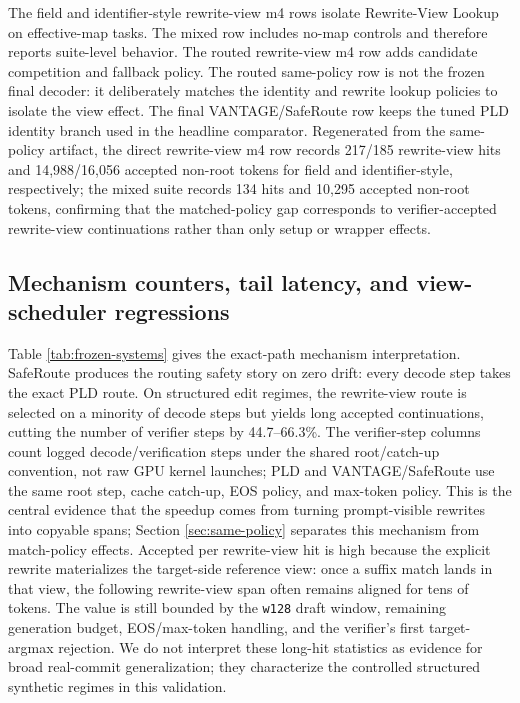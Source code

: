 \documentclass[11pt,a4paper]{article}
\begin{document}
The field and identifier-style rewrite-view m4 rows isolate Rewrite-View Lookup
on effective-map tasks. The mixed row includes no-map controls and therefore
reports suite-level behavior. The routed rewrite-view m4 row adds candidate
competition and fallback policy. The routed same-policy
row is not the frozen final decoder: it deliberately matches the identity and
rewrite lookup policies to isolate the view effect. The final VANTAGE/SafeRoute
row keeps the tuned PLD identity branch used in the headline comparator.
Regenerated from the same-policy artifact, the direct
rewrite-view m4 row records 217/185 rewrite-view hits and 14,988/16,056
accepted non-root tokens for field and identifier-style, respectively; the
mixed suite records 134 hits and 10,295 accepted non-root tokens,
confirming that the matched-policy gap corresponds to verifier-accepted
rewrite-view continuations rather than only setup or wrapper effects.

\subsection{Mechanism counters, tail latency, and view-scheduler regressions}

Table \ref{tab:frozen-systems} gives the exact-path mechanism interpretation.
SafeRoute produces the routing safety story on zero drift: every
decode step takes the exact PLD route. On structured edit regimes,
the rewrite-view route is selected on a minority of decode steps but yields
long accepted continuations, cutting the number of verifier steps by
44.7--66.3\%. The verifier-step columns count
logged decode/verification steps under the shared root/catch-up convention, not
raw GPU kernel launches; PLD and VANTAGE/SafeRoute use the same root step, cache
catch-up, EOS policy, and max-token policy. This is the central
evidence that the speedup comes from turning prompt-visible rewrites into
copyable spans; Section \ref{sec:same-policy} separates this mechanism
from match-policy effects.
Accepted per rewrite-view hit is high because the explicit rewrite materializes
the target-side reference view: once a suffix match lands in that view,
the following rewrite-view span often remains aligned for tens of tokens.
The value is still bounded by the \texttt{w128} draft window, remaining
generation budget, EOS/max-token handling, and the verifier's first
target-argmax rejection. We do not interpret these long-hit statistics
as evidence for broad real-commit generalization; they characterize the
controlled structured synthetic regimes in this validation.
\end{document}
